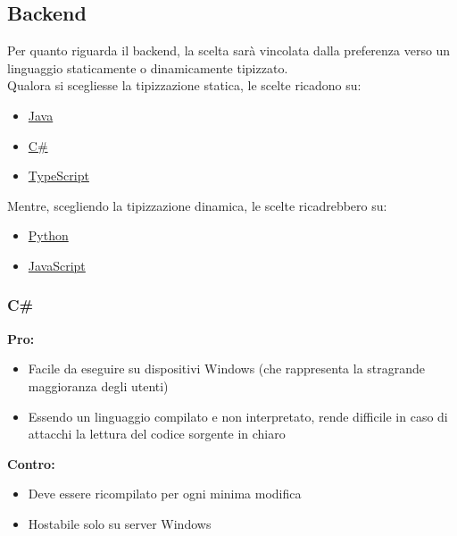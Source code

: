 \documentclass[a4paper, 12pt]{article}
\begin{document}
\subsection{Backend}
Per quanto riguarda il backend, la scelta sarà vincolata dalla preferenza verso un linguaggio staticamente o dinamicamente tipizzato. \\
Qualora si scegliesse la tipizzazione statica, le scelte ricadono su:
\begin{itemize}
    \item \href{https://www.java.com/it/}{Java}
    \item \href{https://learn.microsoft.com/en-us/dotnet/csharp/}{C\#}
    \item \href{https://www.typescriptlang.org/}{TypeScript}
\end{itemize}
Mentre, scegliendo la tipizzazione dinamica, le scelte ricadrebbero su:
\begin{itemize}
    \item \href{https://www.python.org/}{Python}
    \item \href{https://www.javascript.com/}{JavaScript}
\end{itemize}
\subsubsection{C\#}
\textbf{Pro:}
\begin{itemize}
    \item Facile da eseguire su dispositivi Windows (che rappresenta la stragrande maggioranza degli utenti)
    \item Essendo un linguaggio compilato e non interpretato, rende difficile in caso di attacchi la lettura del codice sorgente in chiaro
\end{itemize}
\vspace*{0.5cm}
\textbf{Contro:}
\begin{itemize}
    \item Deve essere ricompilato per ogni minima modifica
    \item Hostabile solo su server Windows
\end{itemize}
\end{document}
